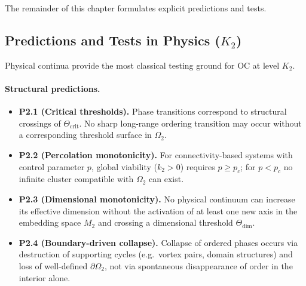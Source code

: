 The remainder of this chapter formulates explicit predictions and tests.

\subsection{Predictions and Tests in Physics (\texorpdfstring{$K_2$}{K\_2})}

Physical continua provide the most classical testing ground for OC at level
\(K_2\).

\paragraph{Structural predictions.}
\begin{itemize}
  \item \textbf{P2.1 (Critical thresholds).}
        Phase transitions correspond to structural crossings of
        \(\Theta_{\mathrm{crit}}\).  No sharp long-range ordering transition
        may occur without a corresponding threshold surface in \(\Omega_2\).
  \item \textbf{P2.2 (Percolation monotonicity).}
        For connectivity-based systems with control parameter \(p\),
        global viability (\(k_2>0\)) requires \(p \ge p_c\);
        for \(p<p_c\) no infinite cluster compatible with \(\Omega_2\)
        can exist.
  \item \textbf{P2.3 (Dimensional monotonicity).}
        No physical continuum can increase its effective dimension without
        the activation of at least one new axis in the embedding space \(M_2\)
        and crossing a dimensional threshold \(\Theta_{\mathrm{dim}}\).
  \item \textbf{P2.4 (Boundary-driven collapse).}
        Collapse of ordered phases occurs via destruction of supporting
        cycles (e.g.\ vortex pairs, domain structures) and loss of
        well-defined \(\partial\Omega_2\), not via spontaneous disappearance
        of order in the interior alone.
\end{itemize}

